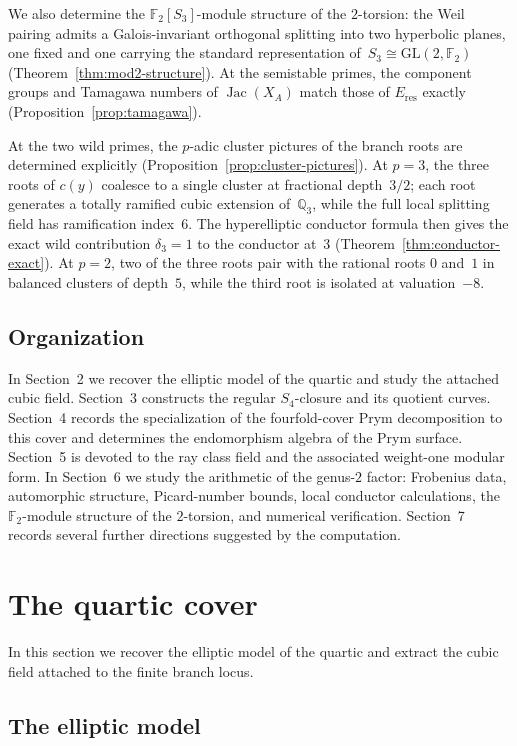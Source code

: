 \documentclass[11pt,letterpaper]{article}
\theoremstyle{plain}
\theoremstyle{remark}
\newcommand{\QQ}{\mathbb{Q}}
\newcommand{\Jac}{\operatorname{Jac}}
\newcommand{\F}{\mathbb{F}}
\begin{document}
We also determine the \(\F_2[S_3]\)-module structure of the \(2\)-torsion: the Weil pairing admits a Galois-invariant orthogonal splitting into two hyperbolic planes, one fixed and one carrying the standard representation of~\(S_3\cong\mathrm{GL}(2,\F_2)\) (Theorem~\ref{thm:mod2-structure}). At the semistable primes, the component groups and Tamagawa numbers of \(\Jac(X_A)\) match those of \(E_{\mathrm{res}}\) exactly (Proposition~\ref{prop:tamagawa}).

At the two wild primes, the \(p\)-adic cluster pictures of the branch roots are determined explicitly (Proposition~\ref{prop:cluster-pictures}). At \(p=3\), the three roots of \(c(y)\) coalesce to a single cluster at fractional depth~\(3/2\); each root generates a totally ramified cubic extension of~\(\QQ_3\), while the full local splitting field has ramification index~\(6\). The hyperelliptic conductor formula then gives the exact wild contribution \(\delta_3=1\) to the conductor at~\(3\) (Theorem~\ref{thm:conductor-exact}). At \(p=2\), two of the three roots pair with the rational roots \(0\) and~\(1\) in balanced clusters of depth~\(5\), while the third root is isolated at valuation~\(-8\).

\subsection{Organization}
In Section~2 we recover the elliptic model of the quartic and study the attached cubic field. Section~3 constructs the regular \(S_4\)-closure and its quotient curves. Section~4 records the specialization of the fourfold-cover Prym decomposition to this cover and determines the endomorphism algebra of the Prym surface. Section~5 is devoted to the ray class field and the associated weight-one modular form. In Section~6 we study the arithmetic of the genus-\(2\) factor: Frobenius data, automorphic structure, Picard-number bounds, local conductor calculations, the \(\F_2\)-module structure of the \(2\)-torsion, and numerical verification. Section~7 records several further directions suggested by the computation.

\section{The quartic cover}

In this section we recover the elliptic model of the quartic and extract the cubic field attached to the finite branch locus.

\subsection{The elliptic model}
\end{document}
